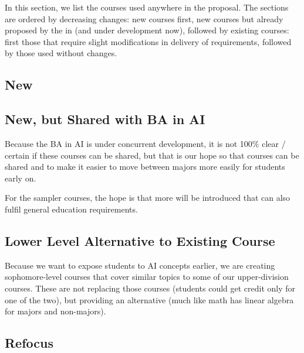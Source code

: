 \documentclass[
10pt, %
a4paper, %
oneside, %
headinclude,footinclude, %
BCOR5mm, %
]{scrartcl}
\begin{document}
In this section, we list the courses used anywhere in the proposal.  The sections are ordered by decreasing changes: new courses first, new courses but already proposed by the  in  (and under development now), followed by existing courses: first those that require slight modifications in delivery of requirements, followed by those used without changes.  

  \subsection{New}

  

  \subsection{New, but Shared with BA in AI}

  Because the BA in AI is under concurrent development, it is not 100\% clear / certain if these courses can be shared, but that is our hope so that courses can be shared and to make it easier to move between majors more easily for students early on.  

  For the sampler courses, the hope is that more will be introduced that can also fulfil general education requirements.

  

    \subsection{Lower Level Alternative to Existing Course}

    Because we want to expose students to AI concepts earlier, we are creating sophomore-level courses that cover similar topics to some of our upper-division courses.  These are not replacing those courses (students could get credit only for one of the two), but providing an alternative (much like math has linear algebra for majors and non-majors).

    



  \subsection{Refocus}
\end{document}
